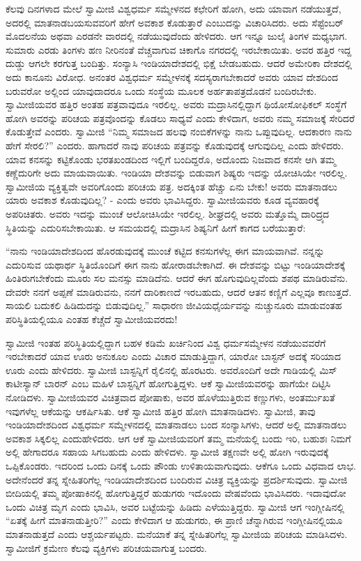  ಕೆಲವು ದಿನಗಳಾದ ಮೇಲೆ ಸ್ವಾಮೀಜಿ ವಿಶ್ವಧರ್ಮ ಸಮ್ಮೇಳನದ ಕಛೇರಿಗೆ ಹೋಗಿ, ಅದು ಯಾವಾಗ ನಡೆಯುತ್ತದೆ, ಅದರಲ್ಲಿ ಮಾತನಾಡಬಯಸುವವರಿಗೆ ಹೇಗೆ ಅವಕಾಶ ಕೊಡುತ್ತಾರೆ ಎಂಬುದನ್ನು ವಿಚಾರಿಸಿದರು. ಅದು ಸೆಪ್ಟೆಂಬರ್ ಮೊದಲನೆಯ ಅಥವಾ ಎರಡನೇ ವಾರದಲ್ಲಿ ನಡೆಯುವುದೆಂದು ಹೇಳಿದರು. ಆಗ ಇನ್ನೂ ಜುಲೈ ತಿಂಗಳ ಮಧ್ಯಭಾಗ. ಸುಮಾರು ಎರಡು ತಿಂಗಳು ಹಣ ನೀರಿನಂತೆ ವೆಚ್ಚವಾಗುವ ಚಿಕಾಗೊ ನಗರದಲ್ಲಿ ಇರಬೇಕಾಯಿತು. ಅವರ ಹತ್ತಿರ ಇದ್ದ ದುಡ್ಡು ಆಗಲೇ ಕರಗುತ್ತ ಬಂದಿತ್ತು. ಸಂನ್ಯಾಸಿ ಇಂಡಿಯಾದೇಶದಲ್ಲಿ ಭಿಕ್ಷೆ ಬೇಡಬಹುದು. ಆದರೆ ಅಮೇರಿಕಾ ದೇಶದಲ್ಲಿ ಅದು ಕಾನೂನು ವಿರೋಧ. ಅನಂತರ ವಿಶ್ವಧರ್ಮ ಸಮ್ಮೇಳನಕ್ಕೆ ಸದಸ್ಯರಾಗಬೇಕಾದರೆ ಅವರು ಯಾವ ದೇಶದಿಂದ ಬರುವರೋ ಅಲ್ಲಿಂದ ಯಾವುದಾದರೂ ಒಂದು ಸಂಸ್ಥೆಯ ಮೂಲಕ ಅರ್ಹತಾಪತ್ರದೊಡನೆ ಬಂದಿರಬೇಕು. ಸ್ವಾಮೀಜಿಯವರ ಹತ್ತಿರ ಅಂತಹ ಪತ್ರವಾವುದೂ ಇರಲಿಲ್ಲ. ಅವರು ಮದ್ರಾಸಿನಲ್ಲಿದ್ದಾಗ ಥಿಯೋಸೋಫಿಕಲ್ ಸಂಸ್ಥೆಗೆ ಹೋಗಿ ಅವರನ್ನು ಪರಿಚಯ ಪತ್ರವೊಂದನ್ನು ಕೊಡಲು ಸಾಧ್ಯವೆ ಎಂದು ಕೇಳಿದಾಗ, ಅವರು ನಮ್ಮ ಸಮಾಜಕ್ಕೆ ಸೇರಿದರೆ ಕೊಡುತ್ತೇವೆ ಎಂದರು. ಸ್ವಾಮೀಜಿ “ನಿಮ್ಮ ಸಮಾಜದ ಹಲವು ನಂಬಿಕೆಗಳನ್ನು ನಾನು ಒಪ್ಪುವುದಿಲ್ಲ. ಆದಕಾರಣ ನಾನು ಹೇಗೆ ಸೇರಲಿ?” ಎಂದರು. ಹಾಗಾದರೆ ನಾವು ಪರಿಚಯ ಪತ್ರವನ್ನು ಕೊಡುವುದಕ್ಕೆ ಆಗುವುದಿಲ್ಲ ಎಂದು ಹೇಳಿದರು. ಯಾವ ಕನಸನ್ನು ಕಟ್ಟಿಕೊಂಡು ಭರತಖಂಡದಿಂದ ಇಲ್ಲಿಗೆ ಬಂದಿದ್ದರೊ, ಅದೊಂದು ನಿಜವಾದ ಕನಸೇ ಆಗಿ ತಮ್ಮ ಕಣ್ಣೆದುರಿಗೇ ಅದು ಮಾಯವಾಯಿತು. ಇಂಡಿಯಾ ದೇಶವನ್ನು ಬಿಡುವಾಗ ಶಿಷ್ಯರು ಇದನ್ನು ಯೋಚಿಸಿಯೇ ಇರಲಿಲ್ಲ. ಸ್ವಾಮೀಜಿಯ ವ್ಯಕ್ತಿತ್ವವೇ ಅವರಿಗೊಂದು ಪರಿಚಯ ಪತ್ರ. ಅದಕ್ಕಿಂತ ಹೆಚ್ಚು ಏನು ಬೇಕು! ಅವರು ಮಾತನಾಡಲು ಯಾರು ಅವಕಾಶ ಕೊಡುವುದಿಲ್ಲ? - ಎಂದು ಅವರು ಭಾವಿಸಿದ್ದರು. ಸ್ವಾಮೀಜಿಯವರು ಕೂಡ ವ್ಯವಹಾರಕ್ಕೆ ಅಪರಿಚಿತರು. ಅವರು ಇದನ್ನು ಮುಂಚೆ ಆಲೋಚಿಸಿಯೇ ಇರಲಿಲ್ಲ. ಶೀಘ್ರದಲ್ಲಿ ಅವರು ಮತ್ತೊಮ್ಮೆ ದಾರಿದ್ರ್ಯದ ಸ್ಥಿತಿಯನ್ನು ಎದುರಿಸಬೇಕಾಯಿತು. ಆ ಸಮಯದಲ್ಲಿ ಮದ್ರಾಸಿನ ಶಿಷ್ಯನಿಗೆ ಹೀಗೆ ಕಾಗದ ಬರೆಯುತ್ತಾರೆ: 

 “ನಾನು ಇಂಡಿಯಾದೇಶದಿಂದ ಹೊರಡುವುದಕ್ಕೆ ಮುಂಚೆ ಕಟ್ಟಿದ ಕನಸುಗಳೆಲ್ಲ ಈಗ ಮಾಯವಾಗಿವೆ. ನನ್ನನ್ನು ಎದುರಿಸುವ ಯಥಾರ್ಥ ಸ್ಥಿತಿಯೊಂದಿಗೆ ಈಗ ನಾನು ಹೋರಾಡಬೇಕಾಗಿದೆ. ಈ ದೇಶವನ್ನು ಬಿಟ್ಟು ಇಂಡಿಯಾದೇಶಕ್ಕೆ ಹಿಂತಿರುಗಬೇಕೆಂದು ಮೂರು ಸಲ ಮನಸ್ಸು ಮಾಡಿದೆನು. ಆದರೆ ಈಗ ಹೊಗುವುದಿಲ್ಲವೆಂದು ಶಪಥ ಮಾಡಿರುವೆನು. ದೇವರೇ ನನಗೆ ಅಪ್ಪಣೆ ಮಾಡಿರುವನು, ನನಗೆ ದಾರಿಕಾಣದೆ ಇರಬಹುದು, ಆದರೆ ಆತನ ಕಣ್ಣಿಗೆ ಎಲ್ಲವೂ ಕಾಣುತ್ತದೆ. ಸಾಯಲಿ ಬದುಕಲಿ ಹಿಡಿದುದನ್ನು ಬಿಡುವುದಿಲ್ಲ.” ಸಾಧಾರಣ ಜೀವಿಯಧೈರ್ಯವನ್ನು ನುಚ್ಚುನೂರು ಮಾಡುವಂತಹ ಪರಿಸ್ಥಿತಿಯಲ್ಲಿಯೂ ಎಂತಹ ಕೆಚ್ಚೆದೆ ಸ್ವಾಮೀಜಿಯವರದು! 

 ಸ್ವಾಮೀಜಿ ಇಂತಹ ಪರಿಸ್ಥಿತಿಯಲ್ಲಿದ್ದಾಗ ಬಹಳ ಕಡಿಮೆ ಖರ್ಚಿನಿಂದ ವಿಶ್ವ ಧರ್ಮಸಮ್ಮೇಳನ ನಡೆಯುವವರೆಗೆ ಇರಬೇಕಾದರೆ ಯಾವ ಊರು ಅನುಕೂಲ ಎಂದು ವಿಚಾರ ಮಾಡುತ್ತಿದ್ದಾಗ, ಯಾರೋ ಬಾಸ್ಟನ್ ಅದಕ್ಕೆ ಸರಿಯಾದ ಊರು ಎಂದು ಹೇಳಿದರು. ಸ್ವಾಮೀಜಿ ಬಾಸ್ಟನ್ನಿಗೆ ರೈಲಿನಲ್ಲಿ ಹೊರಟರು. ಅವರೊಂದಿಗೆ ಅದೇ ಗಾಡಿಯಲ್ಲಿ ಮಿಸ್ ಕಾಟೀಸ್ಯಾನ್ ಬಾರನ್ ಎಂಬ ಮಹಿಳೆ ಬಾಸ್ಟನ್ನಿಗೆ ಹೋಗುತ್ತಿದ್ದಳು. ಆಕೆ ಸ್ವಾಮೀಜಿಯವರನ್ನು ಹಾಗೆಯೇ ದಿಟ್ಟಿಸಿ ನೋಡಿದಳು. ಸ್ವಾಮೀಜಿಯವರ ವಿಚಿತ್ರವಾದ ಪೋಷಾಕು, ಅವರ ಹೊಳೆಯುತ್ತಿರುವ ಕಣ್ಣುಗಳು, ಅಂತರ್ಮುಖತೆ ಇವುಗಳೆಲ್ಲ ಆಕೆಯನ್ನು ಆಕರ್ಷಿಸಿತು. ಆಕೆ ಸ್ವಾಮೀಜಿ ಹತ್ತಿರ ಹೋಗಿ ಮಾತನಾಡಿದಳು. ಸ್ವಾಮೀಜಿ, ತಾವು ಇಂಡಿಯಾದೇಶದಿಂದ ವಿಶ್ವಧರ್ಮ ಸಮ್ಮೇಳನದಲ್ಲಿ ಮಾತನಾಡಲು ಬಂದ ಸಂನ್ಯಾಸಿಗಳು, ಆದರೆ ಅಲ್ಲಿ ಮಾತನಾಡಲು ಅವಕಾಶ ಸಿಕ್ಕಲಿಲ್ಲ ಎಂದು\break ಹೇಳಿದರು. ಆಗ ಆಕೆ ಸ್ವಾಮೀಜಿಯವರಿಗೆ ತಮ್ಮ ಮನೆಯಲ್ಲಿ ಬಂದು ಇರಿ, ಬಹುಶಃ ನಿಮಗೆ ಅಲ್ಲಿ ಹೇಗಾದರೂ ಸಹಾಯ ಸಿಗಬಹುದು ಎಂದು ಹೇಳಿದಳು. ಸ್ವಾಮೀಜಿ ತಕ್ಷಣವೇ ಅಲ್ಲಿ ಹೋಗಿ ಇರುವುದಕ್ಕೆ ಒಪ್ಪಿಕೊಂಡರು. ಇದರಿಂದ ಒಂದು ದಿನಕ್ಕೆ ಒಂದು ಪೌಂಡು ಉಳಿತಾಯವಾಗುವುದು. ಆಕೆಗೂ ಒಂದು ವಿಧವಾದ ಲಾಭ. ಅದೇನೆಂದರೆ ತನ್ನ ಸ್ನೇಹಿತರಿಗೆಲ್ಲ ಇಂಡಿಯಾದೇಶದಿಂದ ಬಂದಿರುವ ವಿಚಿತ್ರ ವ್ಯಕ್ತಿಯನ್ನು ಪ್ರದರ್ಶಿಸುವುದು. ಸ್ವಾಮೀಜಿ ಬೀದಿಯಲ್ಲಿ ತಮ್ಮ ಪೋಷಾಕಿನಲ್ಲಿ ಹೋಗುತ್ತಿದ್ದರೆ ಹುಡುಗರು ಇದೊಂದು ವೇಷವೆಂದು ಭಾವಿಸಿದರು. ಇದಾವುದೋ ಒಂದು ವಿಚಿತ್ರ ಮೃಗ ಎಂದು ಭಾವಿಸಿ, ಅವರ ಬಟ್ಟೆಯನ್ನು ಹಿಡಿದು ಎಳೆಯುತ್ತಿದ್ದರು. ಸ್ವಾಮೀಜಿ ಆಗ ಇಂಗ್ಲೀಷಿನಲ್ಲಿ “ಏತಕ್ಕೆ ಹೀಗೆ ಮಾತನಾಡುತ್ತೀರಿ?” ಎಂದು ಕೇಳಿದಾಗ ಆ ಹುಡುಗರು, ಈ ಪ್ರಾಣಿ ಚೆನ್ನಾಗಿರುವ ಇಂಗ್ಲೀಷಿನಲ್ಲಿಯೂ ಮಾತನಾಡುತ್ತದೆ ಎಂದು ಆಶ್ಚರ್ಯಪಟ್ಟರು. ಮನೆಯಾಕೆ ತನ್ನ ಸ್ನೇಹಿತರಿಗೆಲ್ಲ ಸ್ವಾಮೀಜಿಯ ಪರಿಚಯ ಮಾಡಿಸಿದಳು. ಸ್ವಾಮೀಜಿಗೆ ಕ್ರಮೇಣ ಕೆಲವು ವ್ಯಕ್ತಿಗಳು ಪರಿಚಯವಾಗುತ್ತ ಬಂದರು. 

